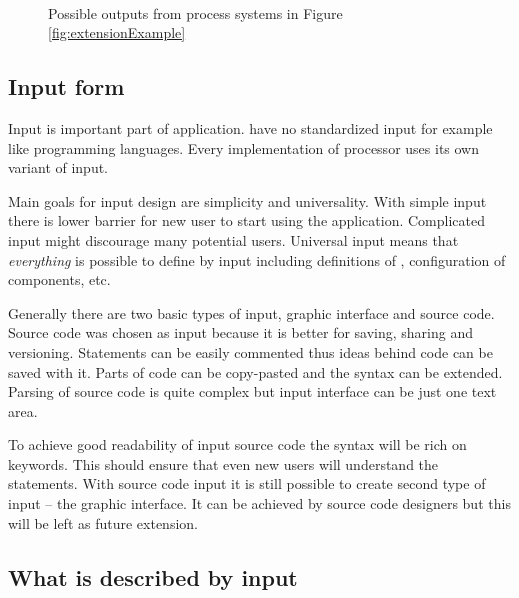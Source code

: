 \begin{figure}[h]
	\centering
	 ~
	\caption{Possible outputs from process systems in Figure \ref{fig:extensionExample}}
	\label{fig:extensionExampleResult}
\end{figure}


\subsection{Input form}

Input is important part of application.
\lsystems have no standardized input for example like programming languages.
Every implementation of \lsystem processor uses its own variant of input.

Main goals for input design are simplicity and universality.
With simple input there is lower barrier for new user to start using the application.
Complicated input might discourage many potential users.
Universal input means that \textit{everything} is possible to define by input including definitions of \lsystems, configuration of components, etc.

Generally there are two basic types of input, graphic interface and source code.
Source code was chosen as input because it is better for saving, sharing and versioning.
Statements can be easily commented thus ideas behind code can be saved with it.
Parts of code can be copy-pasted and the syntax can be extended.
Parsing of source code is quite complex but input interface can be just one text area.


To achieve good readability of input source code the syntax will be rich on keywords.
This should ensure that even new users will understand the statements.
With source code input it is still possible to create second type of input -- the graphic interface.
It can be achieved by source code designers but this will be left as future extension.


\subsection{What is described by input}

